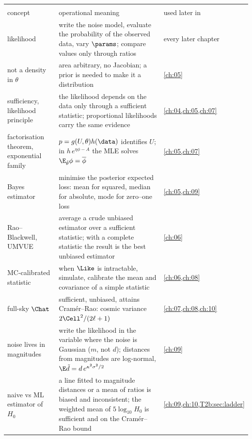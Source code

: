\begin{center}
\small
\renewcommand{\arraystretch}{1.15}
\begin{tabularx}{\linewidth}{@{}>{\raggedright\arraybackslash}p{3.3cm}
                               >{\raggedright\arraybackslash}X
                               >{\raggedright\arraybackslash}p{2.7cm}@{}}
\toprule
\multicolumn{3}{@{}l}{\textbf{The likelihood (second half)}}\\
concept & operational meaning & used later in\\\midrule
likelihood & write the noise model, evaluate the probability of the observed data, vary $\params$; compare values only through ratios & every later chapter\\
not a density in $\theta$ & area arbitrary, no Jacobian; a prior is needed to make it a distribution & \cref{ch:05}\\
sufficiency, likelihood principle & the likelihood depends on the data only through a sufficient statistic; proportional likelihoods carry the same evidence & \cref{ch:04,ch:05,ch:07}\\
factorisation theorem, exponential family & $p=g(U,\theta)h(\data)$ identifies $U$; in $h\,e^{\eta\phi-A}$ the MLE solves $\E_{\hat\theta}\phi=\overline{\phi}$ & \cref{ch:05,ch:07}\\
Bayes estimator & minimise the posterior expected loss: mean for squared, median for absolute, mode for zero--one loss & \cref{ch:05,ch:09}\\
Rao--Blackwell, UMVUE & average a crude unbiased estimator over a sufficient statistic; with a complete statistic the result is the best unbiased estimator & \cref{ch:06}\\
MC-calibrated statistic & when $\Like$ is intractable, simulate, calibrate the mean and covariance of a simple statistic & \cref{ch:06,ch:08}\\
full-sky $\Chat$ & sufficient, unbiased, attains Cram\'er--Rao: cosmic variance $2\Cell^2/(2\ell+1)$ & \cref{ch:07,ch:08,ch:10}\\
noise lives in magnitudes & write the likelihood in the variable where the noise is Gaussian ($m$, not $d$); distances from magnitudes are log-normal, $\E\tilde d=d\,e^{\kappa^2\sigma^2/2}$ & \cref{ch:09}\\
naive vs ML estimator of $H_0$ & a line fitted to magnitude distances or a mean of ratios is biased and inconsistent; the weighted mean of $5\log_{10}H_0$ is sufficient and on the Cram\'er--Rao bound & \cref{ch:09,ch:10,T2b:sec:ladder}\\

\end{tabularx}
\end{center}

